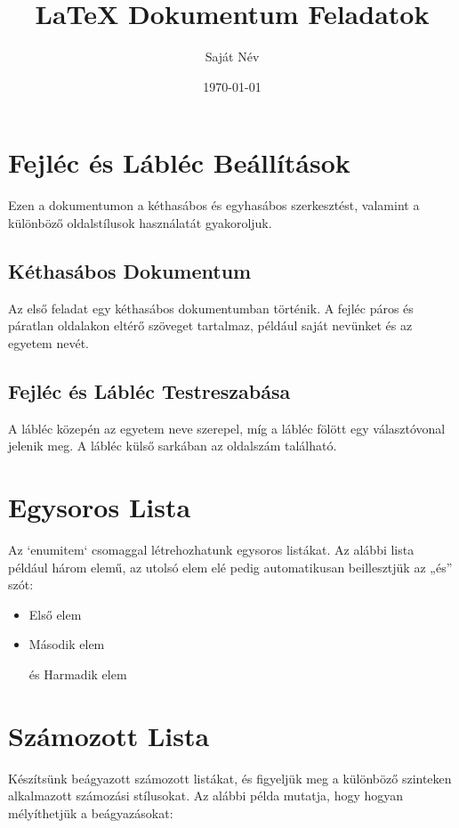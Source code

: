 \documentclass[12pt]{article}
\begin{document}
\title{LaTeX Dokumentum Feladatok}
\author{Saját Név}
\date{\today}
\maketitle
\thispagestyle{plain} %

\section{Fejléc és Lábléc Beállítások}
Ezen a dokumentumon a kéthasábos és egyhasábos szerkesztést, valamint a különböző oldalstílusok használatát gyakoroljuk.

\subsection{Kéthasábos Dokumentum}
Az első feladat egy kéthasábos dokumentumban történik. A fejléc páros és páratlan oldalakon eltérő szöveget tartalmaz, például saját nevünket és az egyetem nevét.

\hulipsum[1]

\subsection{Fejléc és Lábléc Testreszabása}
A lábléc közepén az egyetem neve szerepel, míg a lábléc fölött egy választóvonal jelenik meg. A lábléc külső sarkában az oldalszám található.

\hulipsum[2]

\section{Egysoros Lista}
Az `enumitem` csomaggal létrehozhatunk egysoros listákat. Az alábbi lista például három elemű, az utolsó elem elé pedig automatikusan beillesztjük az „és” szót:

\begin{itemize}[label=---]
  \item Első elem
  \item Második elem
  \item[és] Harmadik elem
\end{itemize}

\section{Számozott Lista}
Készítsünk beágyazott számozott listákat, és figyeljük meg a különböző szinteken alkalmazott számozási stílusokat. Az alábbi példa mutatja, hogy hogyan mélyíthetjük a beágyazásokat:
\end{document}
